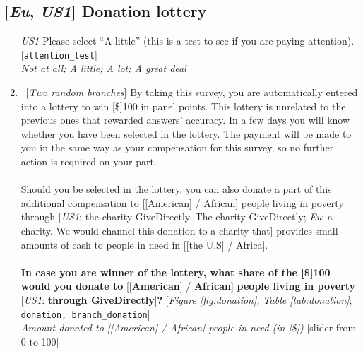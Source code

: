 \subsection*{[\textit{Eu}, \textit{US1}] Donation lottery}
\begin{enumerate}[resume] \item [\textit{US1}] Please select ``A little'' (this is a test to see if you are paying attention). [\verb|attention_test|]
\\ \textit{Not at all; A little; A lot; A great deal}
\item ~[\textit{Two random branches}]  \label{q:donation} By taking this survey, you are automatically entered into a lottery to win [\$]100 in panel points. This lottery is unrelated to the previous ones that rewarded answers' accuracy. In a few days you will know whether you have been selected in the lottery. The payment will be made to you in the same way as your compensation for this survey, so no further action is required on your part.\\
\\
Should you be selected in the lottery, you can also donate a part of this additional compensation to [[American] / African] people living in poverty through [\textit{US1}: the charity GiveDirectly. The charity GiveDirectly; \textit{Eu}: a charity. We would channel this donation to a charity that] provides small amounts of cash to people in need in [[the U.S] / Africa].\\
\\
\textbf{In case you are winner of the lottery, what share of the [\$]100 would you donate to} [[\textbf{American}] / \textbf{African}] \textbf{people living in poverty} [\textit{US1}: \textbf{through GiveDirectly}]\textbf{?}  [\textit{Figure \ref{fig:donation}, Table \ref{tab:donation}}; \verb|donation, branch_donation|]
\\ \textit{Amount donated to [[American] / African] people in need (in [\$])} [slider from 0 to 100]
\end{enumerate}

